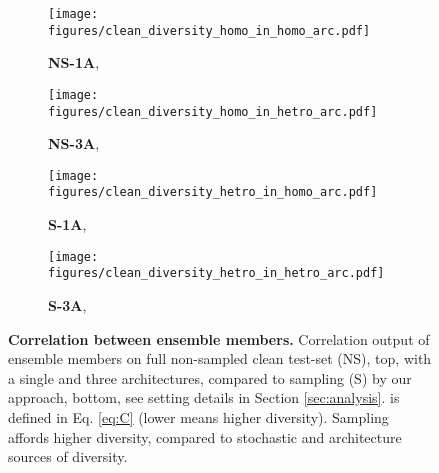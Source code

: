\documentclass[10pt,twocolumn]{article}
\begin{document}
\begin{figure}[ptbh!]
    \centering
    \captionsetup[subfigure]{justification=centering}
    \begin{subfigure}[t]{0.2\textwidth} \texttt{[image: figures/clean\_diversity\_homo\_in\_homo\_arc.pdf]}
\caption{{\bf NS-1A}, }
        \label{subfig:clean_homo_homo}
    \end{subfigure}
    \begin{subfigure}[t]{0.2\textwidth} \texttt{[image: figures/clean\_diversity\_homo\_in\_hetro\_arc.pdf]}
\caption{{\bf NS-3A}, }    
        \label{subfig:clean_homo_hetro}
    \end{subfigure}
    \begin{subfigure}[t]{0.2\textwidth} \texttt{[image: figures/clean\_diversity\_hetro\_in\_homo\_arc.pdf]}
\caption{{\bf S-1A}, }
        \label{subfig:clean_hetro_homo}
    \end{subfigure}
    \begin{subfigure}[t]{0.2\textwidth} \texttt{[image: figures/clean\_diversity\_hetro\_in\_hetro\_arc.pdf]}
\caption{{\bf S-3A}, }
        \label{subfig:clean_hetro_hetro}
    \end{subfigure}
\caption{\textbf{Correlation between ensemble members.} Correlation output of ensemble members on full non-sampled clean test-set (NS), top, with a single and three architectures, compared to sampling (S) by our approach, bottom, see setting details in Section \ref{sec:analysis}.  is defined in Eq. \eqref{eq:C} (lower means higher diversity). Sampling affords higher diversity, compared to stochastic and architecture sources of diversity. 
    }
    \label{fig:corr}
\end{figure}
\end{document}
